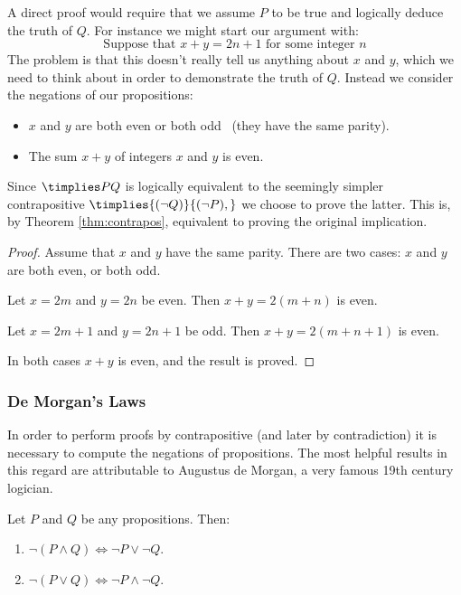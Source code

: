 \noindent A direct proof would require that we assume $P$ to be true and logically deduce the truth of $Q$. For instance we might start our argument with:
\[\text{Suppose that $x+y=2n+1$ for some integer $n$}\]
The problem is that this doesn't really tell us anything about $x$ and $y$, which we need to think about in order to demonstrate the truth of $Q$. Instead we consider the negations of our propositions:
\begin{itemize}\setlength{\itemsep}{0pt}
  \item[]\quad $x$ and $y$ are both even or both odd \ (they have the same parity).
  \item[]\quad The sum $x+y$ of integers $x$ and $y$ is even.
\end{itemize}
Since $\timplies PQ$ is logically equivalent to the seemingly simpler contrapositive $\timplies{(\neg Q)}{(\neg P),}$ we choose to prove the latter. This is, by Theorem \ref{thm:contrapos}, equivalent to proving the original implication.

\begin{proof}
Assume that $x$ and $y$ have the same parity. There are two cases: $x$ and $y$ are both even, or both odd.
\begin{description}\setlength{\itemsep}{0pt}
  \item[Case 1:] Let $x=2m$ and $y=2n$ be even. Then $x+y=2(m+n)$ is even.
  \item[Case 2:] Let $x=2m+1$ and $y=2n+1$ be odd. Then $x+y=2(m+n+1)$ is even.
\end{description}
In both cases $x+y$ is even, and the result is proved.
\end{proof}

 
\subsubsection*{De Morgan's Laws}

In order to perform proofs by contrapositive (and later by contradiction) it is necessary to compute the negations of propositions. The most helpful results in this regard are attributable to Augustus de Morgan, a very famous 19th century logician.

\begin{thm}\label{thm:demorgan}
Let $P$ and $Q$ be any propositions. Then:
\begin{enumerate}\setlength{\itemsep}{0pt}
  \item $\neg(P\wedge Q)\iff \neg P\vee\neg Q$.
  \item $\neg(P\vee Q)\iff \neg P\wedge\neg Q$.
\end{enumerate}
\end{thm}

